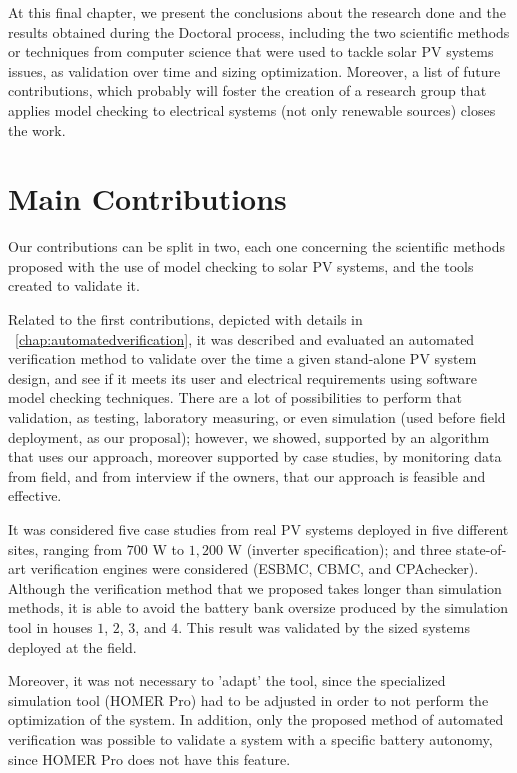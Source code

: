 At this final chapter, we present the conclusions about the research done and the results obtained during the Doctoral process, including the two scientific methods or techniques from computer science that were used to tackle solar PV systems issues, as validation over time and sizing optimization. Moreover, a list of future contributions, which probably will foster the creation of a research group that applies model checking to electrical systems (not only renewable sources) closes the work.

\section{Main Contributions}

Our contributions can be split in two, each one concerning the scientific methods proposed with the use of model checking to solar PV systems, and the tools created to validate it.

Related to the first contributions, depicted with details in ~\autoref{chap:automatedverification}, it was described and evaluated an automated verification method to validate over the time a given stand-alone PV system design, and see if it meets its user and electrical requirements using software model checking techniques. There are a lot of possibilities to perform that validation, as testing, laboratory measuring, or even simulation (used before field deployment, as our proposal); however, we showed, supported by an algorithm that uses our approach, moreover supported by case studies, by monitoring data from field, and from interview if the owners, that our approach is feasible and effective.

It was considered five case studies from real PV systems deployed in five different sites, ranging from $700$ W to $1,200$ W (inverter specification); and three state-of-art verification engines were considered (ESBMC, CBMC, and CPAchecker). Although the verification method that we proposed takes longer than simulation methods, it is able to avoid the battery bank oversize produced by the simulation tool in houses $1$, $2$, $3$, and $4$. This result was validated by the sized systems deployed at the field.

Moreover, it was not necessary to 'adapt' the tool, since the specialized simulation tool (HOMER Pro) had to be adjusted in order to not perform the optimization of the system. In addition, only the proposed method of automated verification was possible to validate a system with a specific battery autonomy, since HOMER Pro does not have this feature.

